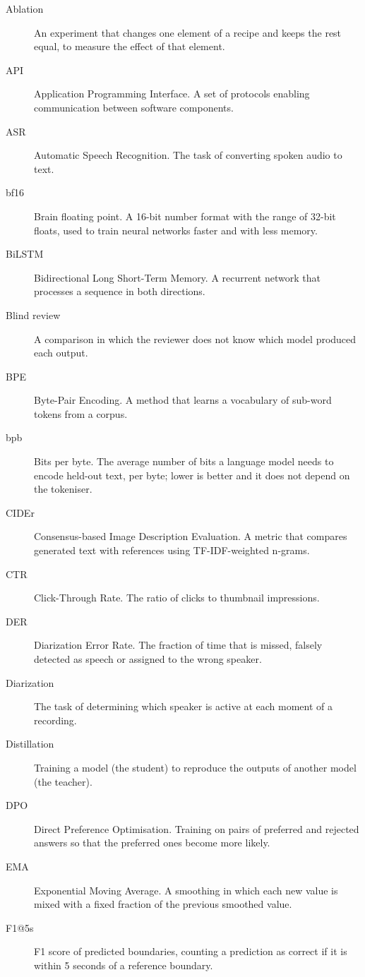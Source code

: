 \documentclass[ENG]{TFUOC}
\begin{document}
\begin{description}
\item[Ablation] An experiment that changes one element of a recipe and keeps the rest equal, to measure the effect of that element.
\item[API] Application Programming Interface. A set of protocols enabling communication between software components.
\item[ASR] Automatic Speech Recognition. The task of converting spoken audio to text.
\item[bf16] Brain floating point. A 16-bit number format with the range of 32-bit floats, used to train neural networks faster and with less memory.
\item[BiLSTM] Bidirectional Long Short-Term Memory. A recurrent network that processes a sequence in both directions.
\item[Blind review] A comparison in which the reviewer does not know which model produced each output.
\item[BPE] Byte-Pair Encoding. A method that learns a vocabulary of sub-word tokens from a corpus.
\item[bpb] Bits per byte. The average number of bits a language model needs to encode held-out text, per byte; lower is better and it does not depend on the tokeniser.
\item[CIDEr] Consensus-based Image Description Evaluation. A metric that compares generated text with references using TF-IDF-weighted n-grams.
\item[CTR] Click-Through Rate. The ratio of clicks to thumbnail impressions.
\item[DER] Diarization Error Rate. The fraction of time that is missed, falsely detected as speech or assigned to the wrong speaker.
\item[Diarization] The task of determining which speaker is active at each moment of a recording.
\item[Distillation] Training a model (the student) to reproduce the outputs of another model (the teacher).
\item[DPO] Direct Preference Optimisation. Training on pairs of preferred and rejected answers so that the preferred ones become more likely.
\item[EMA] Exponential Moving Average. A smoothing in which each new value is mixed with a fixed fraction of the previous smoothed value.
\item[F1@5s] F1 score of predicted boundaries, counting a prediction as correct if it is within 5 seconds of a reference boundary.

\end{description}
\end{document}
